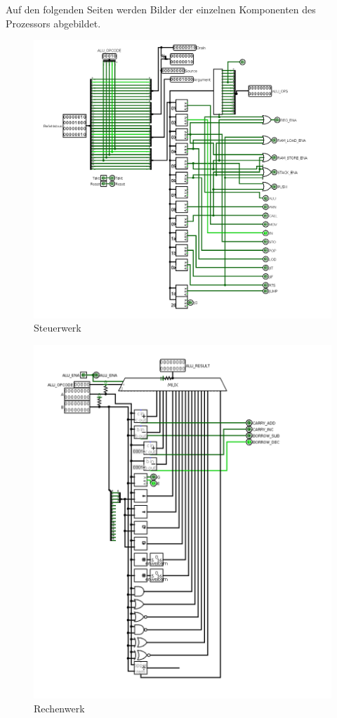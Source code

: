\documentclass[a4paper,12pt]{article}
\begin{document}
\noindent Auf den folgenden Seiten werden Bilder der einzelnen Komponenten des Prozessors abgebildet.



\begin{figure}[!htbp]
\includegraphics[scale=0.35]{cu}
\centering
\caption{Steuerwerk}
\label{fig:cu}
\end{figure}
\newpage
\newpage


\begin{figure}[!htbp]
\includegraphics[scale=0.35]{alu}
\centering
\caption{Rechenwerk}
\label{fig:alu}
\end{figure}
\end{document}
